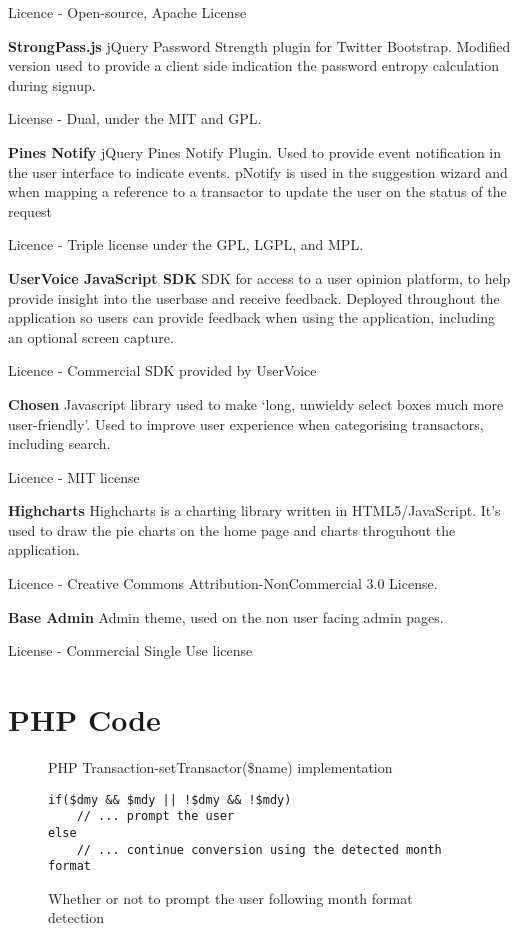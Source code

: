 \begin{appendices}
Licence - Open-source, Apache License

\textbf{StrongPass.js}
jQuery Password Strength plugin for Twitter Bootstrap.
%
Modified version used to provide a client side indication the password entropy calculation during signup.

License - Dual, under the MIT and GPL.

\textbf{Pines Notify}
jQuery Pines Notify Plugin. Used to provide event notification in the user interface to indicate events.
%
pNotify is used in the suggestion wizard and when mapping a reference to a transactor to update the user on the status of the request

Licence - Triple license under the GPL, LGPL, and MPL.

\textbf{UserVoice JavaScript SDK}
SDK for access to a user opinion platform, to help provide insight into the userbase and receive feedback.
%
Deployed throughout the application so users can provide feedback when using the application, including an optional screen capture.

Licence - Commercial SDK provided by UserVoice

\textbf{Chosen}
Javascript library used to make `long, unwieldy select boxes much more user-friendly'.
%
Used to improve user experience when categorising transactors, including search.

Licence - MIT license

\textbf{Highcharts}
Highcharts is a charting library written in HTML5/JavaScript.
%
It's used to draw the pie charts on the home page and charts throguhout the application.

Licence - Creative Commons Attribution-NonCommercial 3.0 License.

\textbf{Base Admin}
Admin theme, used on the non user facing admin pages.

License - Commercial Single Use license

\chapter{PHP Code} 

\begin{figure}

\caption{PHP Transaction-\>setTransactor(\$name) implementation}
\label{fig:settransactor}
\end{figure}

\begin{figure}
\lstset{style=phpcolor}
\begin{lstlisting}
if($dmy && $mdy || !$dmy && !$mdy)
    // ... prompt the user
else
    // ... continue conversion using the detected month format
\end{lstlisting}
\caption{Whether or not to prompt the user following month format detection}
\end{figure}

\end{appendices}

